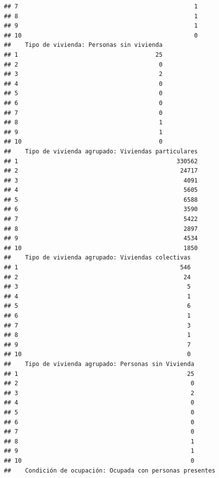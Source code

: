 \documentclass[11pt,]{article}
\begin{document}
\begin{verbatim}
## 7                                                  1
## 8                                                  1
## 9                                                  1
## 10                                                 0
##    Tipo de vivienda: Personas sin vivienda
## 1                                       25
## 2                                        0
## 3                                        2
## 4                                        0
## 5                                        0
## 6                                        0
## 7                                        0
## 8                                        1
## 9                                        1
## 10                                       0
##    Tipo de vivienda agrupado: Viviendas particulares
## 1                                             330562
## 2                                              24717
## 3                                               4091
## 4                                               5605
## 5                                               6588
## 6                                               3590
## 7                                               5422
## 8                                               2897
## 9                                               4534
## 10                                              1850
##    Tipo de vivienda agrupado: Viviendas colectivas
## 1                                              546
## 2                                               24
## 3                                                5
## 4                                                1
## 5                                                6
## 6                                                1
## 7                                                3
## 8                                                1
## 9                                                7
## 10                                               0
##    Tipo de vivienda agrupado: Personas sin Vivienda
## 1                                                25
## 2                                                 0
## 3                                                 2
## 4                                                 0
## 5                                                 0
## 6                                                 0
## 7                                                 0
## 8                                                 1
## 9                                                 1
## 10                                                0
##    Condición de ocupación: Ocupada con personas presentes

\end{verbatim}
\end{document}
